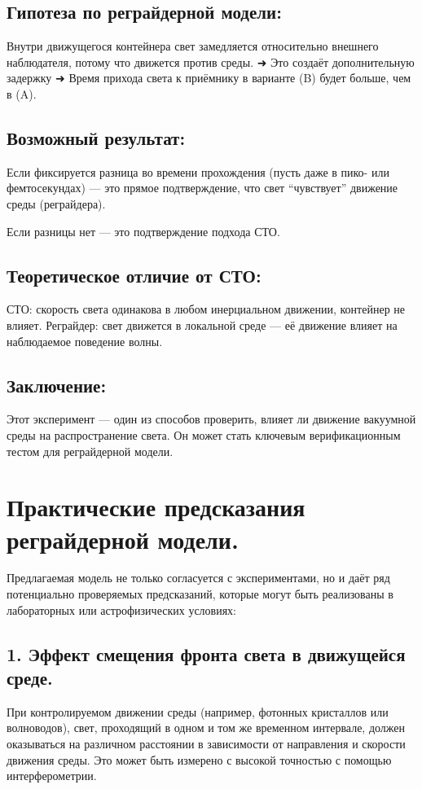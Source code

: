 \documentclass[12pt]{article}
\begin{document}
\subsection*{Гипотеза по реграйдерной модели:}
Внутри движущегося контейнера свет замедляется относительно внешнего наблюдателя, потому что движется против среды.
➜ Это создаёт дополнительную задержку
➜ Время прихода света к приёмнику в варианте (B) будет больше, чем в (A).

\subsection*{Возможный результат:}
Если фиксируется разница во времени прохождения (пусть даже в пико- или фемтосекундах) — это прямое подтверждение, что свет “чувствует” движение среды (реграйдера).

Если разницы нет — это подтверждение подхода СТО.

\subsection*{Теоретическое отличие от СТО:}
СТО: скорость света одинакова в любом инерциальном движении, контейнер не влияет.
Реграйдер: свет движется в локальной среде — её движение влияет на наблюдаемое поведение волны.

\subsection*{Заключение:}
Этот эксперимент — один из способов проверить, влияет ли движение вакуумной среды на распространение света.
Он может стать ключевым верификационным тестом для реграйдерной модели.

\section*{Практические предсказания реграйдерной модели.}

Предлагаемая модель не только согласуется с экспериментами, но и даёт ряд потенциально проверяемых предсказаний, которые могут быть реализованы в лабораторных или астрофизических условиях:

\subsection*{1. Эффект смещения фронта света в движущейся среде.}
При контролируемом движении среды (например, фотонных кристаллов или волноводов), свет, проходящий в одном и том же временном интервале, должен оказываться на различном расстоянии в зависимости от направления и скорости движения среды. Это может быть измерено с высокой точностью с помощью интерферометрии.
\end{document}

